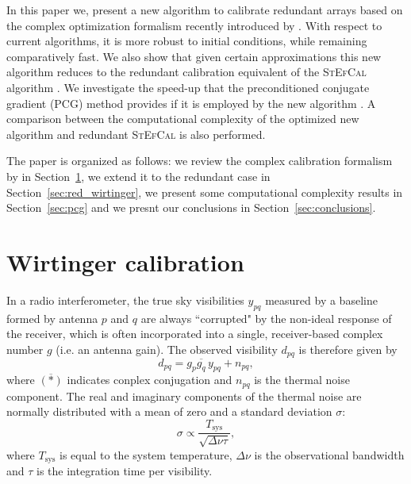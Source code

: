\documentclass[useAMS,usenatbib]{mn2e}
\newcommand{\conj}[1]{\overline{#1}}
\begin{document}
In this paper we, present a new algorithm to calibrate redundant arrays based on the complex optimization formalism recently introduced by \cite{Smirnov2015}. 
With respect to current algorithms, it is more robust to initial conditions, while remaining comparatively fast. We also show that given certain approximations this new algorithm reduces to the redundant calibration equivalent of the \textsc{StEfCal} algorithm \citep{Salvini2014}.
We investigate the speed-up that the preconditioned conjugate gradient (PCG) method provides if it is employed by the new algorithm \citep{Liu2010}.
A comparison between the computational complexity of the optimized new algorithm and redundant \textsc{StEfCal} is also performed.

The paper is organized as follows: we review the complex calibration formalism by \citet{Smirnov2015} in Section~\ref{sec:sky_wirtinger}, we extend it to the redundant case in Section~\ref{sec:red_wirtinger}, we present some computational complexity results in Section~\ref{sec:pcg} and we presnt our conclusions in Section~\ref{sec:conclusions}.

\section{Wirtinger calibration}
\label{sec:sky_wirtinger}

In a radio interferometer, the true sky visibilities $y_{pq}$ measured by a baseline formed by antenna $p$ and $q$ are always ``corrupted" by the non-ideal response of the receiver, which is often incorporated into a single, receiver-based complex number $g$ (i.e. an antenna gain). The observed visibility $d_{pq}$ is therefore given by \citep{ME1,ME2,RRIME1}
\begin{equation}
\label{eq:vis_definition}
d_{pq} = g_{p}\conj{g_q} \, y_{pq} + n_{pq},
\end{equation}
where $\conj{(*)}$ indicates conplex conjugation and $n_{pq}$ is the thermal noise component. 
The real and imaginary components of the thermal noise are normally distributed with a mean of zero and a
standard deviation $\sigma$:
\begin{equation}
\sigma \propto \frac{T_{\textrm{sys}}}{\sqrt{\Delta \nu \tau}},
\end{equation}
where $T_{\textrm{sys}}$ is equal to the system temperature, $\Delta \nu$ is the observational bandwidth and $\tau$ is the integration time per visibility.
\end{document}
